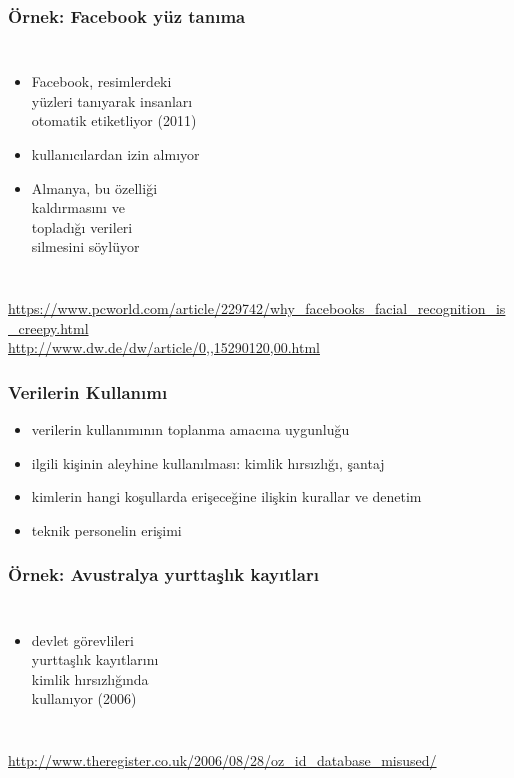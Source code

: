 \documentclass[dvipsnames]{beamer}
\theoremstyle{plain}
\begin{document}
\begin{frame}
  \frametitle{Örnek: Facebook yüz tanıma}

  \begin{columns}

    \begin{itemize}
      \item Facebook, resimlerdeki\\
        yüzleri tanıyarak insanları\\
        otomatik etiketliyor (2011)
      \item kullanıcılardan izin almıyor
      \item Almanya, bu özelliği\\
        kaldırmasını ve\\
        topladığı verileri\\
        silmesini söylüyor
    \end{itemize}
  \end{columns}

  \medskip
  \tiny{\url{https://www.pcworld.com/article/229742/why_facebooks_facial_recognition_is_creepy.html}}\\
  \tiny{\url{http://www.dw.de/dw/article/0,,15290120,00.html}}\\
\end{frame}

\begin{frame}
  \frametitle{Verilerin Kullanımı}

  \begin{itemize}
    \item verilerin kullanımının toplanma amacına uygunluğu
    \item ilgili kişinin aleyhine kullanılması: kimlik hırsızlığı, şantaj

    \medskip
    \item kimlerin hangi koşullarda erişeceğine ilişkin kurallar ve denetim
    \item teknik personelin erişimi
  \end{itemize}
\end{frame}

\begin{frame}
  \frametitle{Örnek: Avustralya yurttaşlık kayıtları}

  \begin{columns}

    \begin{itemize}
      \item devlet görevlileri\\
        yurttaşlık kayıtlarını\\
        kimlik hırsızlığında\\
        kullanıyor (2006)
    \end{itemize}
  \end{columns}

  \medskip
  \tiny{\url{http://www.theregister.co.uk/2006/08/28/oz_id_database_misused/}}\\
\end{frame}
\end{document}
